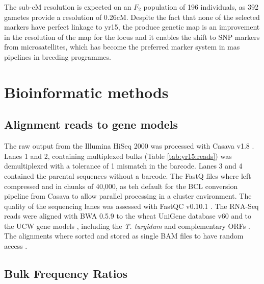 The sub-cM resolution is expected on an $F_{2}$ population of 196 individuals, as 392 gametes provide a resolution of 0.26{}cM. 
Despite the fact that none of the selected markers have perfect linkage to \acrshort{yr15}, the produce genetic map is an improvement in the resolution of the map for the locus and it enables the shift to SNP markers from microsatellites, which has become the preferred marker system in \acrshort{mas} pipelines in breeding programmes. 


\section{Bioinformatic methods}

\subsection{Alignment reads to gene models}

The raw output from the Illumina HiSeq 2000 was processed with Casava v1.8 \citep{casavaBCL}. 
Lanes 1 and 2, containing multiplexed bulks (Table \ref{tab:yr15:reads}) was demultiplexed with a tolerance of 1 mismatch in the barcode. 
Lanes 3 and 4 contained the parental sequences without a barcode. 
The FastQ files where left compressed and in chunks of 40,000, as teh default for the BCL conversion pipeline from Casava to allow parallel processing in a cluster environment. 
The quality of the sequencing lanes was assessed with FastQC v0.10.1 \citep{fastqc}. 
The RNA-Seq reads were aligned with BWA 0.5.9 \citep{Li2009} to the wheat UniGene database v60 \citep{PontiusJUWagnerL2002} and to the UCW gene models \citep{Krasileva2013}, including the \textit{T. turgidum} and complementary ORFs \citep{MASWheat2013}.
The alignments where sorted and stored as single BAM files to have random access \citep{Li2009a}. 


\subsection{Bulk Frequency Ratios}
\label{yr15:sub:bfr}

